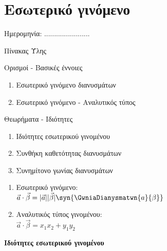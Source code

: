 \documentclass[internet]{frontisthrio}
\newcommand{\myitem}{\stepcounter{enumi}\item[\raisebox{0.5mm}{\faExclamationTriangle}\ \Large$\square$]}
\begin{document}
\section{Εσωτερικό γινόμενο}
\begin{flushright}
\faCalendar* Ημερομηνία: .......................
\end{flushright}
\begin{mybox}[mysubtitle]{Πίνακας Ύλης}
\begin{tcbraster}[raster columns=2,raster equal height]
\begin{myleftbox}{Ορισμοί - Βασικές έννοιες\ \ \faBook}
\begin{enumerate}[itemsep=0mm]
\item Εσωτερικό γινόμενο διανυσμάτων
\item Εσωτερικό γινόμενο - Αναλυτικός τύπος
\end{enumerate}
\end{myleftbox}
\begin{myrightbox}{Θεωρήματα - Ιδιότητες\ \ \faTools}
\begin{enumerate}[itemsep=0mm]
\item Ιδιότητες εσωτερικού γινομένου
\item Συνθήκη καθετότητας διανυσμάτων
\item Συνημίτονο γωνίας διανυσμάτων
\end{enumerate}
\end{myrightbox}
\end{tcbraster}
\begin{multicols}{2}
\begin{todolist}[itemsep=0mm]
\myitem 
\end{todolist}
\end{multicols}
\begin{multicols}{2}
\begin{enumerate}[itemsep=0mm,leftmargin=5mm]
\item Εσωτερικό γινόμενο: \\$\vec{a}\cdot\vec{\beta}=|\vec{a}||\vec{\beta}|\syn{\GwniaDianysmatwn{a}{\beta}}$
\item Αναλυτικός τύπος γινομένου:\\$\vec{a}\cdot\vec{\beta}=x_1x_2+y_1y_2$
\end{enumerate}
\end{multicols}
\begin{center}
\textbf{Ιδιότητες εσωτερικού γινομένου}\\

\end{center}
\end{mybox}
\end{document}
